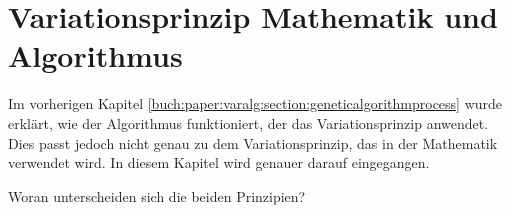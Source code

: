 %
%
%
%
\section{Variationsprinzip Mathematik und Algorithmus
\label{buch:paper:varalg:section:variations_math_algorithm_result}}
Im vorherigen Kapitel \ref{buch:paper:varalg:section:geneticalgorithmprocess} wurde erklärt, 
wie der Algorithmus funktioniert, der das Variationsprinzip anwendet. Dies 
passt jedoch nicht genau zu dem Variationsprinzip, das in der Mathematik 
verwendet wird. In diesem Kapitel wird genauer darauf eingegangen.

Woran unterscheiden sich die beiden Prinzipien?

